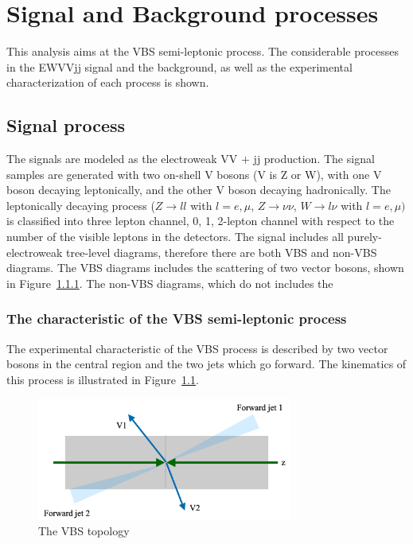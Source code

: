 \chapter{Signal and Background processes}

This analysis aims at the VBS semi-leptonic process. The considerable processes in the EWVVjj signal and the background, as well as the experimental characterization of each process is shown.

\section{Signal process}
The signals are modeled as the electroweak VV $\plus$ jj production. The signal samples are generated with two on-shell V bosons (V is Z or W), with one V boson decaying leptonically, and the other V boson decaying hadronically. The leptonically decaying process ($Z \rightarrow ll$ with $l = e,\mu$, $Z \rightarrow \nu\nu$, $W\rightarrow l\nu$ with $l = e,\mu)$ is classified into three lepton channel, 0, 1, 2-lepton channel with respect to the number of the visible leptons in the detectors. The signal includes all purely-electroweak tree-level diagrams, therefore there are both VBS and non-VBS diagrams.
The VBS diagrams includes the scattering of two vector bosons, shown in Figure~\ref{}.
The non-VBS diagrams, which do not includes  the 


\subsection{The characteristic of the VBS semi-leptonic process}
The experimental characteristic of the VBS process is described by two vector bosons in the central region and the two jets which go forward.
The kinematics of this process is illustrated in Figure~\ref{fig:VBStopology}.
\begin{figure}[tbp]
\begin{center}
 \includegraphics[width=0.75\textwidth,keepaspectratio]{figures/VBStopology}
\caption{
The VBS topology
}
\label{fig:VBStopology}
\end{center}
\end{figure}

